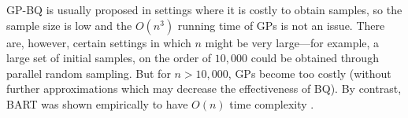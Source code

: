 GP-BQ is usually proposed in settings where it is costly to obtain samples, so the sample size is low and the $O(n^3)$ running time of GPs is not an issue. There are, however, certain settings in which $n$ might be very large---for example, a large set of initial samples, on the order of $10,000$ could be obtained through parallel random sampling. But for $n > 10,000$, GPs become too costly (without further approximations which may decrease the effectiveness of BQ). By contrast, BART was shown empirically to have $O(n)$ time complexity \cite{BART}. 



